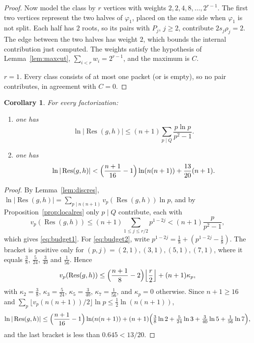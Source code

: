 \documentclass[11pt]{amsart}
\newtheorem{corollary}[theorem]{Corollary}
\theoremstyle{definition}
\theoremstyle{remark}
\numberwithin{equation}{section}
\newcommand{\Res}{\operatorname{Res}}
\begin{document}
\begin{proof}
Now model the class by $r$ vertices with weights $2,2,4,8,\dots,2^{r-1}$.
The first two vertices represent the two halves of $\varphi_1$, placed on
the same side when $\varphi_1$ is not split. Each half has $2$ roots, so
its pairs with $P_j$, $j\ge2$, contribute $2s_j\rho_j=2$. The edge between
the two halves has weight $2$, which bounds the internal contribution just
computed. The weights satisfy the hypothesis of Lemma~\ref{lem:maxcut},
$\sum_{i<r}w_i=2^{r-1}$, and the maximum is $C$.

\emph{$r=1$.} Every class consists of at most one packet (or is empty),
so no pair contributes, in agreement with $C=0$.
\end{proof}

\begin{corollary}\label{cor:budget}
For every factorization:
\begin{enumerate}
\item[(a)] one has
\begin{equation}\label{eq:budget1}
 \ln|\Res(g,h)|\le (n+1)\sum_{p\mid Q}\frac{p\ln p}{p^2-1}.
\end{equation}
\item[(b)] one has
\begin{equation}\label{eq:budget2}
 \ln|\Res(g,h)|<\Bigl(\frac{n+1}{16}-1\Bigr)\ln(n(n+1))+\frac{13}{20}(n+1) .
\end{equation}
\end{enumerate}
\end{corollary}

\begin{proof}
By Lemma~\ref{lem:discres}, $\ln|\Res(g,h)|=\sum_{p\mid n(n+1)}v_p(\Res(g,h))\ln p$, and
by Proposition~\ref{prop:localres} only $p\mid Q$ contribute, each with
\[
 v_p(\Res(g,h))\le(n+1)\sum_{1\le j\le r/2}p^{1-2j}<(n+1)\frac p{p^2-1},
\]
which gives \eqref{eq:budget1}. For \eqref{eq:budget2}, write
$p^{1-2j}=\frac18+(p^{1-2j}-\frac18)$. The bracket is positive only for
$(p,j)=(2,1),(3,1),(5,1),(7,1)$, where it equals $\frac38$, $\frac5{24}$,
$\frac3{40}$ and $\frac1{56}$. Hence
\[
 v_p(\Res(g,h))\le\Bigl(\frac{n+1}8-2\Bigr)\Bigl\lfloor\frac r2\Bigr\rfloor
 +(n+1)\kappa_p ,
\]
with $\kappa_2=\frac38$, $\kappa_3=\frac5{24}$, $\kappa_5=\frac3{40}$,
$\kappa_7=\frac1{56}$, and $\kappa_p=0$ otherwise. Since $n+1\ge16$ and
$\sum_p\lfloor v_p(n(n+1))/2\rfloor\ln p\le\frac12\ln(n(n+1))$,
\[
 \ln|\Res(g,h)|\le\Bigl(\frac{n+1}{16}-1\Bigr)\ln(n(n+1))
 +(n+1)\Bigl(\tfrac38\ln2+\tfrac5{24}\ln3+\tfrac3{40}\ln5
 +\tfrac1{56}\ln7\Bigr),
\]
and the last bracket is less than $0.645<13/20$.
\end{proof}
\end{document}
